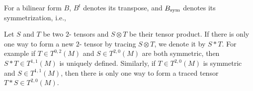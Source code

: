 For a bilinear form $B$, $B^t$ denotes its transpose,
and $B_{\mathrm{sym}}$ denotes its symmetrization, i.e.,

Let $S$ and $T$ be two $2$- tensors and $S\otimes T$ be their tensor product. If there is only one way to form a new $2$- tensor by tracing $S\otimes T$, we denote it by $S\ast T$. For example if $T\in T^{0,2}(M)$ and $S\in T^{2,0}(M)$ are both symmetric, then $S\ast T\in T^{1,1}(M)$ is uniquely defined. Similarly, if $T\in T^{2,0}(M)$ is symmetric and $S\in T^{1,1}(M)$, then there is only one way to form a traced tensor $T\ast S\in T^{2,0}(M)$.



